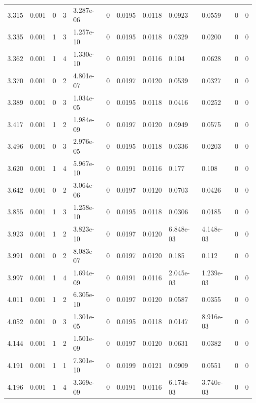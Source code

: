 \documentclass[preview]{standalone}
\begin{document}
{{{\begin{tabular}{L{1.2cm}C{1.2cm} C{0.3cm}C{0.5cm} C{1.4cm}C{1.4cm} C{1.4cm}C{1.4cm} C{1.6cm}C{1.6cm} C{1.6cm}C{1.6cm}}
  3.315  &  0.001  & 0     &  3 &  3.287e-06  & 0  &  0.0195&   0.0118& 0.0923 & 0.0559   &  0 & 0  \\ 
  3.335  &  0.001  & 1     &  3 &  1.257e-10  & 0  &  0.0195&   0.0118& 0.0329 & 0.0200   &  0 & 0  \\ 
  3.362  &  0.001  & 1     &  4 &  1.330e-10  & 0  &  0.0191&   0.0116& 0.104 & 0.0628   &  0 & 0  \\ 
  3.370  &  0.001  & 0     &  2 &  4.801e-07  & 0  &  0.0197&   0.0120& 0.0539 & 0.0327   &  0 & 0  \\ 
  3.389  &  0.001  & 0     &  3 &  1.034e-05  & 0  &  0.0195&   0.0118& 0.0416 & 0.0252   &  0 & 0  \\ 
  3.417  &  0.001  & 1     &  2 &  1.984e-09  & 0  &  0.0197&   0.0120& 0.0949 & 0.0575   &  0 & 0  \\ 
  3.496  &  0.001  & 0     &  3 &  2.976e-05  & 0  &  0.0195&   0.0118& 0.0336 & 0.0203   &  0 & 0  \\ 
  3.620  &  0.001  & 1     &  4 &  5.967e-10  & 0  &  0.0191&   0.0116& 0.177 & 0.108   &  0 & 0  \\ 
  3.642  &  0.001  & 0     &  2 &  3.064e-06  & 0  &  0.0197&   0.0120& 0.0703 & 0.0426   &  0 & 0  \\ 
  3.855  &  0.001  & 1     &  3 &  1.258e-10  & 0  &  0.0195&   0.0118& 0.0306 & 0.0185   &  0 & 0  \\ 
  3.923  &  0.001  & 1     &  2 &  3.823e-10  & 0  &  0.0197&   0.0120& 6.848e-03 & 4.148e-03   &  0 & 0  \\ 
  3.991  &  0.001  & 0     &  2 &  8.083e-07  & 0  &  0.0197&   0.0120& 0.185 & 0.112   &  0 & 0  \\ 
  3.997  &  0.001  & 1     &  4 &  1.694e-09  & 0  &  0.0191&   0.0116& 2.045e-03 & 1.239e-03   &  0 & 0  \\ 
  4.011  &  0.001  & 1     &  2 &  6.305e-10  & 0  &  0.0197&   0.0120& 0.0587 & 0.0355   &  0 & 0  \\ 
  4.052  &  0.001  & 0     &  3 &  1.301e-05  & 0  &  0.0195&   0.0118& 0.0147 & 8.916e-03   &  0 & 0  \\ 
  4.144  &  0.001  & 1     &  2 &  1.501e-09  & 0  &  0.0197&   0.0120& 0.0631 & 0.0382   &  0 & 0  \\ 
  4.191  &  0.001  & 1     &  1 &  7.301e-10  & 0  &  0.0199&   0.0121& 0.0909 & 0.0551   &  0 & 0  \\ 
  4.196  &  0.001  & 1     &  4 &  3.369e-09  & 0  &  0.0191&   0.0116& 6.174e-03 & 3.740e-03   &  0 & 0  \\ 

\end{tabular}}}}
\end{document}
